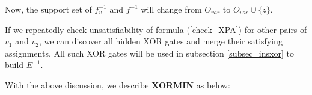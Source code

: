 \documentclass[journal]{IEEEtran}
\begin{document}
Now,
the support set of $f^{-1}_v$ and $f^{-1}$ will change from $O_{var}$ to $O_{var}\cup \{z\}$.

If we repeatedly check unsatisfiability of formula (\ref{check_XPA}) for other pairs of $v_1$ and $v_2$,
we can discover all hidden XOR gates and merge their satisfying assignments.
All such XOR gates will be used in subsection \ref{subsec_insxor} to build $E^{-1}$.

%

With the above discussion,
we describe \textbf{XORMIN} as below:

\vspace{0.2cm}
\end{document}
